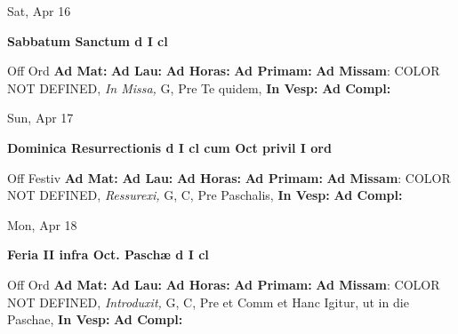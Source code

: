 \documentclass[10pt]{memoir}
\begin{document}
\begin{center}
\begin{minipage}{3.5in}
\vspace{2em}
\begin{center}Sat, Apr 16
\end{center}
\textbf{ \large Sabbatum Sanctum
\textnormal{\normalsize d I cl}}

\begin{justify}Off Ord
\textbf{Ad Mat: }
\textbf{Ad Lau: }
\textbf{Ad Horas: }
\textbf{Ad Primam: }\textbf{Ad Missam}: COLOR NOT DEFINED, \textit{In Missa,} G, Pre Te quidem, 
\textbf{In Vesp: }
\textbf{Ad Compl: }
\end{justify}
\end{minipage}
\end{center}

\begin{center}
\begin{minipage}{3.5in}
\vspace{2em}
\begin{center}Sun, Apr 17
\end{center}
\textbf{ \large Dominica Resurrectionis
\textnormal{\normalsize d I cl cum Oct privil I ord}}

\begin{justify}Off Festiv
\textbf{Ad Mat: }
\textbf{Ad Lau: }
\textbf{Ad Horas: }
\textbf{Ad Primam: }\textbf{Ad Missam}: COLOR NOT DEFINED, \textit{Ressurexi,} G, C, Pre Paschalis, 
\textbf{In Vesp: }
\textbf{Ad Compl: }
\end{justify}
\end{minipage}
\end{center}

\begin{center}
\begin{minipage}{3.5in}
\vspace{2em}
\begin{center}Mon, Apr 18
\end{center}
\textbf{ \large Feria II infra Oct. Paschæ
\textnormal{\normalsize d I cl}}

\begin{justify}Off Ord
\textbf{Ad Mat: }
\textbf{Ad Lau: }
\textbf{Ad Horas: }
\textbf{Ad Primam: }\textbf{Ad Missam}: COLOR NOT DEFINED, \textit{Introduxit,} G, C, Pre et Comm et Hanc Igitur, ut in die Paschae, 
\textbf{In Vesp: }
\textbf{Ad Compl: }
\end{justify}
\end{minipage}
\end{center}
\end{document}
